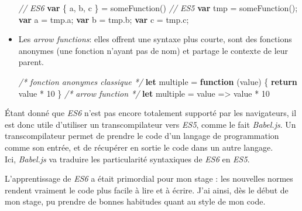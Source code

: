 \documentclass[12pt,a4paper]{article}
\newenvironment{Shaded}{}{}
\newcommand{\KeywordTok}[1]{\textcolor[rgb]{0.00,0.44,0.13}{\textbf{{#1}}}}
\newcommand{\DecValTok}[1]{\textcolor[rgb]{0.25,0.63,0.44}{{#1}}}
\newcommand{\CommentTok}[1]{\textcolor[rgb]{0.38,0.63,0.69}{\textit{{#1}}}}
\newcommand{\VariableTok}[1]{\textcolor[rgb]{0.10,0.09,0.49}{{#1}}}
\newcommand{\ControlFlowTok}[1]{\textcolor[rgb]{0.00,0.44,0.13}{\textbf{{#1}}}}
\newcommand{\OperatorTok}[1]{\textcolor[rgb]{0.40,0.40,0.40}{{#1}}}
\newcommand{\AttributeTok}[1]{\textcolor[rgb]{0.49,0.56,0.16}{{#1}}}
\newcommand{\NormalTok}[1]{{#1}}
\begin{document}
\begin{itemize}
  \begin{Shaded}
  \begin{Highlighting}[]
  \CommentTok{// ES6}
  \KeywordTok{var} \OperatorTok{\{} \NormalTok{a}\OperatorTok{,} \NormalTok{b}\OperatorTok{,} \NormalTok{c }\OperatorTok{\}} \OperatorTok{=} \AttributeTok{someFunction}\NormalTok{()}
  \CommentTok{// ES5}
  \KeywordTok{var} \NormalTok{tmp }\OperatorTok{=} \AttributeTok{someFunction}\NormalTok{()}\OperatorTok{;}
  \KeywordTok{var} \NormalTok{a  }\OperatorTok{=} \VariableTok{tmp}\NormalTok{.}\AttributeTok{a}\OperatorTok{;}
  \KeywordTok{var} \NormalTok{b }\OperatorTok{=} \VariableTok{tmp}\NormalTok{.}\AttributeTok{b}\OperatorTok{;}
  \KeywordTok{var} \NormalTok{c }\OperatorTok{=} \VariableTok{tmp}\NormalTok{.}\AttributeTok{c}\OperatorTok{;}
  \end{Highlighting}
  \end{Shaded}
  \item
    Les \emph{arrow functions}: elles offrent une syntaxe plus courte,
    sont des fonctions anonymes (une fonction n'ayant pas de nom) et
    partage le contexte de leur parent.

  \begin{Shaded}
  \begin{Highlighting}[]
  \CommentTok{/* fonction anonymes classique */}
  \KeywordTok{let} \NormalTok{multiple }\OperatorTok{=} \KeywordTok{function} \NormalTok{(value) }\OperatorTok{\{}
    \ControlFlowTok{return} \NormalTok{value }\OperatorTok{*} \DecValTok{10}
  \OperatorTok{\}}
  \CommentTok{/* arrow function */}
  \KeywordTok{let} \NormalTok{multiple }\OperatorTok{=} \NormalTok{value }\OperatorTok{=>} \NormalTok{value }\OperatorTok{*} \DecValTok{10}
  \end{Highlighting}
  \end{Shaded}
  \end{itemize}

  \bigskip

  Étant donné que \emph{ES6} n'est pas encore totalement supporté par les
  navigateurs, il est donc utile d'utiliser un transcompilateur vers
  \emph{ES5}, comme le fait \emph{Babel.js}. Un transcompilateur permet de
  prendre le code d'un langage de programmation comme son entrée, et de
  récupérer en sortie le code dans un autre langage.\\
  Ici, \emph{Babel.js} va traduire les particularité syntaxiques de
  \emph{ES6} en \emph{ES5}.

  \bigskip

  L'apprentissage de \emph{ES6} a était primordial pour mon stage : les
  nouvelles normes rendent vraiment le code plus facile à lire et à
  écrire. J'ai ainsi, dès le début de mon stage, pu prendre de bonnes
  habitudes quant au style de mon code.
\end{document}
